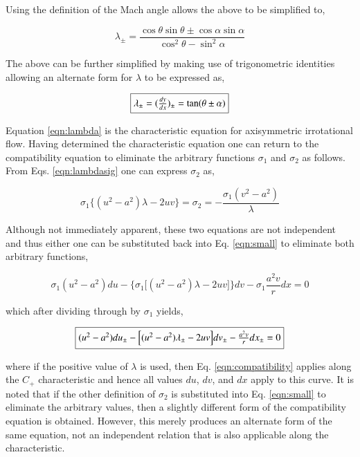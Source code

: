 	Using the definition of the Mach angle allows the above to be simplified to,

\begin{displaymath}
	\lambda_\pm = \frac{\cos\theta \sin\theta \pm \cos\alpha \sin\alpha}
	{\cos^2\theta-\sin^2\alpha}
\end{displaymath}

	The above can be further simplified by making use of trigonometric identities
allowing an alternate form for $\lambda$ to be expressed as,

\begin{equation}
	\fbox{$
	\lambda_\pm = (\frac{dy}{dx})_\pm = \tan(\theta \pm \alpha)
	$}
\label{eqn:lambda}
\end{equation}

	Equation \ref{eqn:lambda} is the characteristic equation for axisymmetric irrotational
flow.  Having determined the characteristic equation one can return to the compatibility equation
to eliminate the arbitrary functions $\sigma_1$ and $\sigma_2$ as follows.  From Eqs. 
\ref{eqn:lambdasig} one can express $\sigma_2$ as,

\begin{displaymath}
	\sigma_1\Big\{(u^2-a^2)\lambda -2uv\Big\} = \sigma_2 = -\frac{\sigma_1(v^2-a^2)}{\lambda}
\end{displaymath}
 
	Although not immediately apparent, these two equations are not independent and thus either
one can be substituted back into Eq. \ref{eqn:small} to eliminate both arbitrary functions,

\begin{displaymath}
	\sigma_1(u^2-a^2)du - \Big\{\sigma_1\Big[(u^2-a^2)\lambda -2uv\Big]\Big\}dv 
	- \sigma_1\frac{a^2v}{r}dx = 0
\end{displaymath}

	which after dividing through by $\sigma_1$ yields,

\begin{equation}
	\fbox{$
	(u^2-a^2)du_{\pm} - \Big[(u^2-a^2)\lambda_{\pm} -2uv\Big]dv_{\pm} - \frac{a^2v}{r}dx_{\pm} = 0
	$}
\label{eqn:compatibility}
\end{equation}

	where if the positive value of $\lambda$ is used, then Eq. \ref{eqn:compatibility}
applies along the $C_+$ characteristic and hence all values $du$, $dv$, and $dx$ apply to
this curve.  It is noted that if the other definition of $\sigma_2$ is substituted into
Eq. \ref{eqn:small} to eliminate the arbitrary values, then a slightly different form of the
compatibility equation is obtained.  However, this merely produces an alternate form of the
same equation, not an independent relation that is also applicable along the characteristic.


